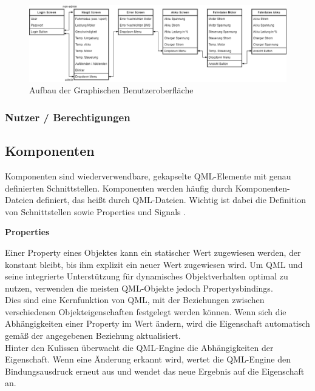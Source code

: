 \begin{figure}[H]
	\begin{center}
		\includegraphics[scale=0.4]{figures/hcis/gui_aufbau.png}
		\caption{Aufbau der Graphischen Benutzeroberfläche}
		\label{fig:aufbauGUI}
	\end{center}
\end{figure}

\newpage

\subsubsection{Nutzer / Berechtigungen}

\subsection{Komponenten}

Komponenten sind wiederverwendbare, gekapselte QML-Elemente mit genau definierten Schnittstellen. Komponenten werden häufig durch Komponenten-Dateien definiert, das heißt durch QML-Dateien. Wichtig ist dabei die Definition von Schnittstellen sowie Properties und Signals .

\textbf{Properties}\\
\vspace{2mm}

Einer Property eines Objektes kann ein statischer Wert zugewiesen werden, der konstant bleibt, bis ihm explizit ein neuer Wert zugewiesen wird. Um QML und seine integrierte Unterstützung für dynamisches Objektverhalten optimal zu nutzen, verwenden die meisten QML-Objekte jedoch Propertysbindings.\\
Dies sind eine Kernfunktion von QML, mit der Beziehungen zwischen verschiedenen Objekteigenschaften festgelegt werden können. Wenn sich die Abhängigkeiten einer Property im Wert ändern, wird die Eigenschaft automatisch gemäß der angegebenen Beziehung aktualisiert.\\
Hinter den Kulissen überwacht die QML-Engine die Abhängigkeiten der Eigenschaft. Wenn eine Änderung erkannt wird, wertet die QML-Engine den Bindungsausdruck erneut aus und wendet das neue Ergebnis auf die Eigenschaft an.

